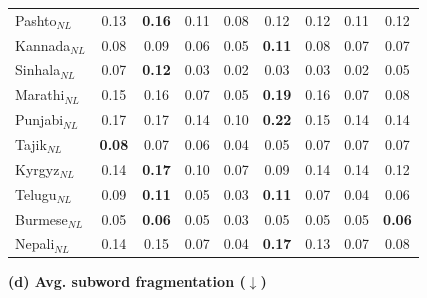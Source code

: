 \begin{table}[t]
\begin{minipage}[t]{0.49\textwidth}
{\begin{tabular}{lcccccccc}
\addlinespace
Pashto$_{NL}$ & 0.13 & \textbf{0.16} & 0.11 & 0.08 & 0.12 & 0.12 & 0.11 & 0.12 \\
Kannada$_{NL}$ & 0.08 & 0.09 & 0.06 & 0.05 & \textbf{0.11} & 0.08 & 0.07 & 0.07 \\
Sinhala$_{NL}$ & 0.07 & \textbf{0.12} & 0.03 & 0.02 & 0.03 & 0.03 & 0.02 & 0.05 \\
Marathi$_{NL}$ & 0.15 & 0.16 & 0.07 & 0.05 & \textbf{0.19} & 0.16 & 0.07 & 0.08 \\
Punjabi$_{NL}$ & 0.17 & 0.17 & 0.14 & 0.10 & \textbf{0.22} & 0.15 & 0.14 & 0.14 \\
Tajik$_{NL}$ & \textbf{0.08} & 0.07 & 0.06 & 0.04 & 0.05 & 0.07 & 0.07 & 0.07 \\
Kyrgyz$_{NL}$ & 0.14 & \textbf{0.17} & 0.10 & 0.07 & 0.09 & 0.14 & 0.14 & 0.12 \\
Telugu$_{NL}$ & 0.09 & \textbf{0.11} & 0.05 & 0.03 & \textbf{0.11} & 0.07 & 0.04 & 0.06 \\
Burmese$_{NL}$ & 0.05 & \textbf{0.06} & 0.05 & 0.03 & 0.05 & 0.05 & 0.05 & \textbf{0.06} \\
Nepali$_{NL}$ & 0.14 & 0.15 & 0.07 & 0.04 & \textbf{0.17} & 0.13 & 0.07 & 0.08 \\
\bottomrule
\end{tabular}}
\end{minipage}\hfill
\begin{minipage}[t]{0.49\textwidth}\centering
\textbf{(d) Avg. subword fragmentation ($\downarrow$)}\\[3pt]
\end{minipage}
\end{table}
